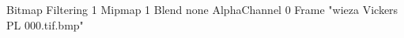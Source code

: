 {Bitmap
	{Filtering 1}
	{Mipmap 1}
	{Blend none}
	{AlphaChannel 0}
	{Frame "wieza Vickers PL 000.tif.bmp"}
}
